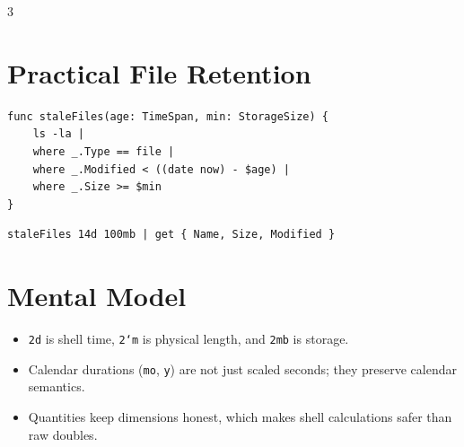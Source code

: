 \begin{multicols*}{3}
\section{Practical File Retention}
\begin{lstlisting}
func staleFiles(age: TimeSpan, min: StorageSize) {
    ls -la |
    where _.Type == file |
    where _.Modified < ((date now) - $age) |
    where _.Size >= $min
}
\end{lstlisting}

\begin{lstlisting}
staleFiles 14d 100mb | get { Name, Size, Modified }
\end{lstlisting}

\section{Mental Model}
\begin{itemize}
\item \texttt{2d} is shell time, \texttt{2`m} is physical length, and \texttt{2mb} is storage.
\item Calendar durations (\texttt{mo}, \texttt{y}) are not just scaled seconds; they preserve calendar semantics.
\item Quantities keep dimensions honest, which makes shell calculations safer than raw doubles.
\end{itemize}

\end{multicols*}

